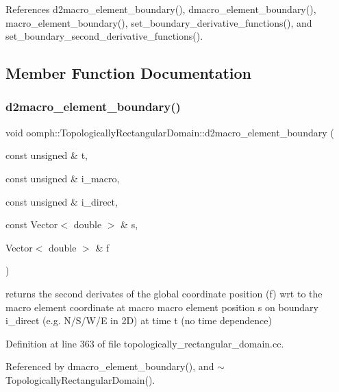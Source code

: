 References d2macro\+\_\+element\+\_\+boundary(), dmacro\+\_\+element\+\_\+boundary(), macro\+\_\+element\+\_\+boundary(), set\+\_\+boundary\+\_\+derivative\+\_\+functions(), and set\+\_\+boundary\+\_\+second\+\_\+derivative\+\_\+functions().



\subsection{Member Function Documentation}
\mbox{\label{classoomph_1_1TopologicallyRectangularDomain_a0b882a9e660cab447c6be8cbeb8c9c18}} 
\subsubsection{\texorpdfstring{d2macro\+\_\+element\+\_\+boundary()}{d2macro\_element\_boundary()}}
{\footnotesize\ttfamily void oomph\+::\+Topologically\+Rectangular\+Domain\+::d2macro\+\_\+element\+\_\+boundary (\begin{DoxyParamCaption}\item[{const unsigned \&}]{t,  }\item[{const unsigned \&}]{i\+\_\+macro,  }\item[{const unsigned \&}]{i\+\_\+direct,  }\item[{const Vector$<$ double $>$ \&}]{s,  }\item[{Vector$<$ double $>$ \&}]{f }\end{DoxyParamCaption})}

returns the second derivates of the global coordinate position (f) wrt to the macro element coordinate at macro macro element position s on boundary i\+\_\+direct (e.\+g. N/\+S/\+W/E in 2D) at time t (no time dependence) 

Definition at line 363 of file topologically\+\_\+rectangular\+\_\+domain.\+cc.



Referenced by dmacro\+\_\+element\+\_\+boundary(), and $\sim$\+Topologically\+Rectangular\+Domain().

\mbox{\label{classoomph_1_1TopologicallyRectangularDomain_ab40347c05811cfa8a76394204fd0611a}} 
